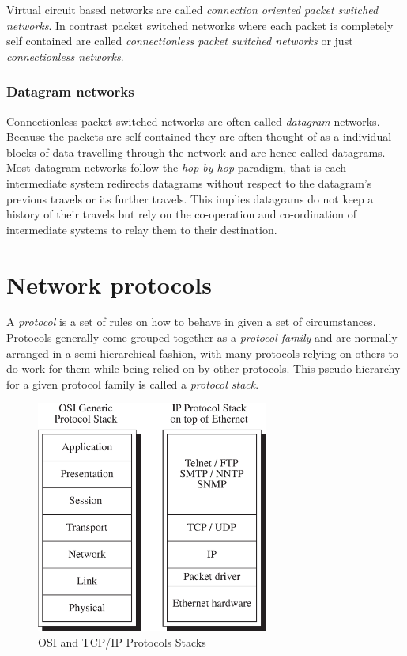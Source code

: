 Virtual circuit based networks are called {\em connection oriented
packet switched networks}.  In contrast packet switched networks where
each packet is completely self contained are called {\em
connectionless packet switched networks} or just {\em connectionless
networks}.

\subsubsection{Datagram networks}

Connectionless packet switched networks are often called {\em
datagram} networks.  Because the packets are self contained they are
often thought of as a individual blocks of data travelling through
the network and are hence called datagrams.  Most datagram networks
follow the {\em hop-by-hop} paradigm, that is each intermediate system
redirects datagrams without respect to the datagram's previous travels
or its further travels.  This implies datagrams do not keep a history
of their travels but rely on the co-operation and co-ordination of
intermediate systems to relay them to their destination.

\section{Network protocols}

A {\em protocol} is a set of rules on how to behave in given a set of
circumstances.  Protocols generally come grouped together as a {\em
protocol family} and are normally arranged in a semi hierarchical
fashion, with many protocols relying on others to do work for them
while being relied on by other protocols.  This pseudo hierarchy for a
given protocol family is called a {\em protocol stack}.

\begin{figure}
\begin{center}
\includegraphics[height=3in]{pics/pstack}
\end{center}
\caption{OSI and TCP/IP Protocols Stacks}
\label{network:pstack}
\end{figure}

